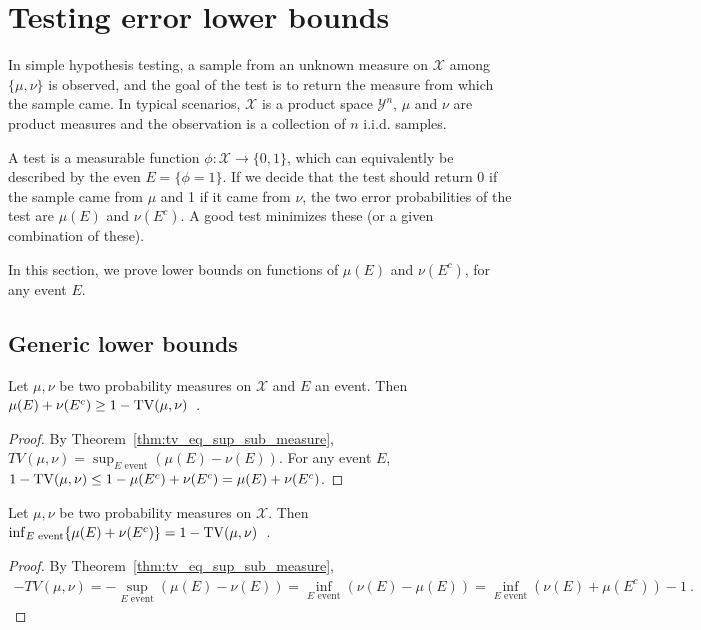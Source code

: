 \chapter{Testing error lower bounds}

In simple hypothesis testing, a sample from an unknown measure on $\mathcal X$ among $\{\mu, \nu\}$ is observed, and the goal of the test is to return the measure from which the sample came.
In typical scenarios, $\mathcal X$ is a product space $\mathcal Y^n$, $\mu$ and $\nu$ are product measures and the observation is a collection of $n$ i.i.d. samples.

A test is a measurable function $\phi : \mathcal X \to \{0,1\}$, which can equivalently be described by the even $E = \{\phi = 1\}$. If we decide that the test should return 0 if the sample came from $\mu$ and 1 if it came from $\nu$, the two error probabilities of the test are $\mu(E)$ and $\nu(E^c)$. A good test minimizes these (or a given combination of these).

In this section, we prove lower bounds on functions of $\mu(E)$ and $\nu(E^c)$, for any event $E$.

\section{Generic lower bounds}

\begin{lemma}
  \label{lem:testing_bound_tv}
  Let $\mu, \nu$ be two probability measures on $\mathcal X$ and $E$ an event. Then $\mu(E) + \nu(E^c) \ge 1 - \operatorname{TV}(\mu, \nu)$~.
\end{lemma}

\begin{proof}
By Theorem~\ref{thm:tv_eq_sup_sub_measure}, $TV(\mu, \nu) = \sup_{E \text{ event}} \left( \mu(E) - \nu(E) \right)$. For any event $E$, 
$1 - \operatorname{TV}(\mu, \nu) \le 1 - \mu(E^c) + \nu(E^c) = \mu(E) + \nu(E^c)$.
\end{proof}

\begin{theorem}
  \label{thm:testing_eq_tv}
  Let $\mu, \nu$ be two probability measures on $\mathcal X$. Then $\inf_{E \text{ event}}\{\mu(E) + \nu(E^c)\} = 1 - \operatorname{TV}(\mu, \nu)$~.
\end{theorem}

\begin{proof}
By Theorem~\ref{thm:tv_eq_sup_sub_measure},
\begin{align*}
-TV(\mu, \nu)
= -\sup_{E \text{ event}} \left( \mu(E) - \nu(E) \right)
=\inf_{E \text{ event}} \left(\nu(E) - \mu(E) \right)
= \inf_{E \text{ event}} \left( \nu(E) + \mu(E^c) \right) - 1
\: .
\end{align*}
\end{proof}

